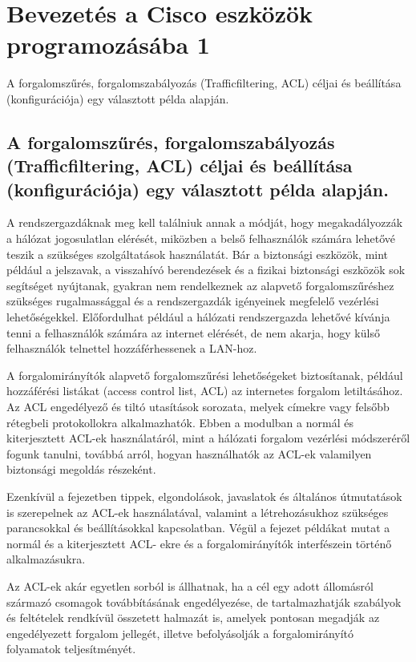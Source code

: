 \section{Bevezetés a Cisco eszközök programozásába 1}
{\footnotesize A forgalomszűrés, forgalomszabályozás (Trafficfiltering, ACL) céljai és beállítása (konfigurációja) egy választott példa alapján.}
\subsection{A forgalomszűrés, forgalomszabályozás (Trafficfiltering, ACL) céljai és beállítása (konfigurációja) egy választott példa alapján.}
A rendszergazdáknak meg kell találniuk annak a módját, hogy megakadályozzák a hálózat
jogosulatlan elérését, miközben a belső felhasználók számára lehetővé teszik a szükséges
szolgáltatások használatát. Bár a biztonsági eszközök, mint például a jelszavak, a visszahívó
berendezések és a fizikai biztonsági eszközök sok segítséget nyújtanak, gyakran nem
rendelkeznek az alapvető forgalomszűréshez szükséges rugalmassággal és a rendszergazdák
igényeinek megfelelő vezérlési lehetőségekkel. Előfordulhat például a hálózati rendszergazda
lehetővé kívánja tenni a felhasználók számára az internet elérését, de nem akarja, hogy külső
felhasználók telnettel hozzáférhessenek a LAN-hoz.

A forgalomirányítók alapvető forgalomszűrési lehetőségeket biztosítanak, például hozzáférési
listákat (access control list, ACL) az internetes forgalom letiltásához. Az ACL engedélyező és
tiltó utasítások sorozata, melyek címekre vagy felsőbb rétegbeli protokollokra alkalmazhatók.
Ebben a modulban a normál és kiterjesztett ACL-ek használatáról, mint a hálózati forgalom
vezérlési módszeréről fogunk tanulni, továbbá arról, hogyan használhatók az ACL-ek
valamilyen biztonsági megoldás részeként.

Ezenkívül a fejezetben tippek, elgondolások, javaslatok és általános útmutatások is
szerepelnek az ACL-ek használatával, valamint a létrehozásukhoz szükséges parancsokkal és
beállításokkal kapcsolatban. Végül a fejezet példákat mutat a normál és a kiterjesztett ACL-
ekre és a forgalomirányítók interfészein történő alkalmazásukra.

Az ACL-ek akár egyetlen sorból is állhatnak, ha a cél egy adott állomásról származó
csomagok továbbításának engedélyezése, de tartalmazhatják szabályok és feltételek rendkívül
összetett halmazát is, amelyek pontosan megadják az engedélyezett forgalom jellegét, illetve
befolyásolják a forgalomirányító folyamatok teljesítményét.

